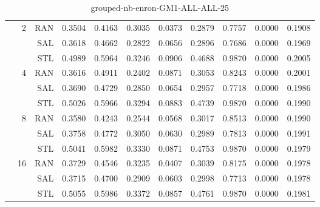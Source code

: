 \begin{center}
\begin{table}[htbp]
\begin{tabular}{ | r | r | r | r | r | r | r | r | r | r | r |}
 & \multirow{3}{*}{2} & RAN & 0.3504 & 0.4163 & 0.3035 & 0.0373 & 0.2879 & 0.7757 & 0.0000 & 0.1908\\ \cline{3-11}
 &   & SAL & 0.3618 & 0.4662 & 0.2822 & 0.0656 & 0.2896 & 0.7686 & 0.0000 & 0.1969\\ \cline{3-11}
 &   & STL & 0.4989 & 0.5964 & 0.3246 & 0.0906 & 0.4688 & 0.9870 & 0.0000 & 0.2005\\ \cline{2-11}
 & \multirow{3}{*}{4} & RAN & 0.3616 & 0.4911 & 0.2402 & 0.0871 & 0.3053 & 0.8243 & 0.0000 & 0.2001\\ \cline{3-11}
 &   & SAL & 0.3690 & 0.4729 & 0.2850 & 0.0654 & 0.2957 & 0.7718 & 0.0000 & 0.1986\\ \cline{3-11}
 &   & STL & 0.5026 & 0.5966 & 0.3294 & 0.0883 & 0.4739 & 0.9870 & 0.0000 & 0.1990\\ \cline{2-11}
 & \multirow{3}{*}{8} & RAN & 0.3580 & 0.4243 & 0.2544 & 0.0568 & 0.3017 & 0.8513 & 0.0000 & 0.1990\\ \cline{3-11}
 &   & SAL & 0.3758 & 0.4772 & 0.3050 & 0.0630 & 0.2989 & 0.7813 & 0.0000 & 0.1991\\ \cline{3-11}
 &   & STL & 0.5041 & 0.5982 & 0.3330 & 0.0871 & 0.4753 & 0.9870 & 0.0000 & 0.1979\\ \cline{2-11}
 & \multirow{3}{*}{16} & RAN & 0.3729 & 0.4546 & 0.3235 & 0.0407 & 0.3039 & 0.8175 & 0.0000 & 0.1978\\ \cline{3-11}
 &   & SAL & 0.3715 & 0.4700 & 0.2909 & 0.0603 & 0.2998 & 0.7713 & 0.0000 & 0.1978\\ \cline{3-11}
 &   & STL & 0.5055 & 0.5986 & 0.3372 & 0.0857 & 0.4761 & 0.9870 & 0.0000 & 0.1981\\ \cline{2-11}
\hline
\end{tabular}
\caption{grouped-nb-enron-GM1-ALL-ALL-25}
\end{table}
\end{center}


